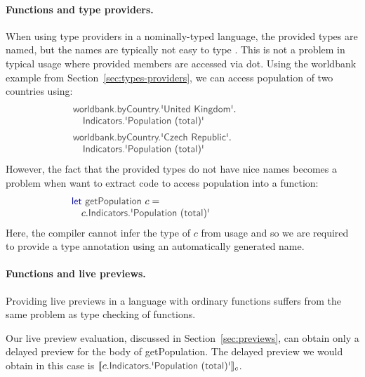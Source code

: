 \documentclass[acmsmall,anonymous,fleqn]{acmart}\settopmatter{printfolios=false,printccs=false,printacmref=false}
\theoremstyle{plain}
\theoremstyle{definition}
\newcommand{\ident}[1]{\textnormal{\textcolor{idclr}{\sffamily #1}}}
\newcommand{\kvd}[1]{\textnormal{\textcolor{kvdclr}{\sffamily #1}}}
\begin{document}
\paragraph{Functions and type providers.} When using type providers in a nominally-typed language,
the provided types are named, but the names are typically not easy to type \cite{fsdata}. This is
not a problem in typical usage where provided members are accessed via dot. Using the \ident{worldbank}
example from Section~\ref{sec:types-providers}, we can access population of two countries using:
%
\begin{equation*}
\begin{array}{l}
\ident{worldbank.byCountry.\textquotesingle United Kingdom\textquotesingle}.\\
\quad \ident{Indicators.\textquotesingle Population (total)\textquotesingle}\\[0.5em]
\ident{worldbank.byCountry.\textquotesingle Czech Republic\textquotesingle}.\\
\quad \ident{Indicators.\textquotesingle Population (total)\textquotesingle}\hspace{9em}
\end{array}
\end{equation*}
%
However, the fact that the provided types do not have nice names becomes a problem when want to
extract code to access population into a function:
%
\begin{equation*}
\begin{array}{l}
\kvd{let}~\ident{getPopulation}~c=\\
\quad c.\ident{Indicators.\textquotesingle Population (total)\textquotesingle}\hspace{8.5em}
\end{array}
\end{equation*}
%
Here, the compiler cannot infer the type of $c$ from usage and so we are required to provide a
type annotation using an automatically generated name.

\paragraph{Functions and live previews.}
Providing live previews in a language with ordinary functions suffers from the same problem as
type checking of functions.

Our live preview evaluation, discussed in Section~\ref{sec:previews}, can obtain only a delayed
preview for the body of \ident{getPopulation}. The delayed preview we would obtain in this case
is $\llbracket c.\ident{Indicators}.\ident{\textquotesingle Population (total)\textquotesingle} \rrbracket_{c}$.
\end{document}
